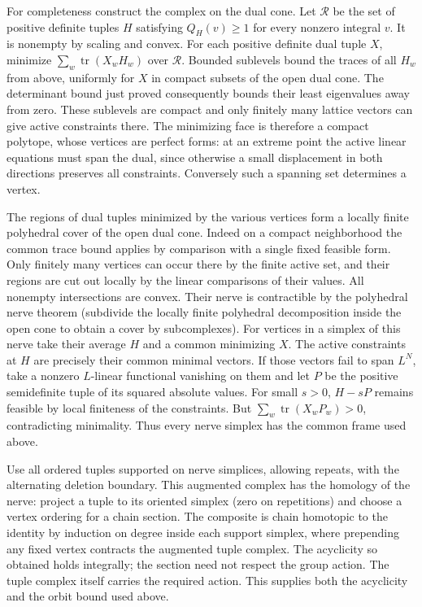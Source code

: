 \documentclass[11pt]{amsart}
\theoremstyle{definition}
\theoremstyle{remark}
\begin{document}
For completeness construct the complex on the dual cone. Let
$\mathcal R$ be the set of positive definite tuples $H$ satisfying
$Q_H(v)\ge1$ for every nonzero integral $v$. It is nonempty by scaling
and convex. For each positive definite dual tuple $X$, minimize
$\sum_w\operatorname{tr}(X_wH_w)$ over $\mathcal R$. Bounded
sublevels bound the traces of all $H_w$ from above, uniformly for
$X$ in compact subsets of the open dual cone. The determinant bound
just proved consequently bounds their least eigenvalues away from
zero. These sublevels are compact and only finitely many lattice
vectors can give active constraints there. The minimizing face is
therefore a compact polytope, whose vertices are perfect forms:
at an extreme point the active linear equations must span the dual,
since otherwise a small displacement in both directions preserves
all constraints. Conversely such a spanning set determines a vertex.

The regions of dual tuples minimized by the various vertices form a
locally finite polyhedral cover of the open dual cone. Indeed on a
compact neighborhood the common trace bound applies by comparison
with a single fixed feasible form. Only finitely many vertices can
occur there by the finite active set, and their regions are cut out
locally by the linear comparisons of their values. All nonempty
intersections are convex. Their nerve is contractible by the
polyhedral nerve theorem (subdivide the locally finite polyhedral
decomposition inside the open cone to obtain a cover by subcomplexes).
For vertices in a simplex of this nerve take their average $H$ and
a common minimizing $X$. The active constraints at $H$ are precisely
their common minimal vectors. If those vectors fail to span $L^N$,
take a nonzero $L$-linear functional vanishing on them and let $P$
be the positive semidefinite tuple of its squared absolute values.
For small $s>0$, $H-sP$ remains feasible by local finiteness of the
constraints. But $\sum_w\operatorname{tr}(X_wP_w)>0$, contradicting
minimality. Thus every nerve simplex has the common frame used above.

Use all ordered tuples supported on nerve simplices, allowing repeats,
with the alternating deletion boundary. This augmented complex has
the homology of the nerve: project a tuple to its oriented simplex
(zero on repetitions) and choose a vertex ordering for a chain section.
The composite is chain homotopic to the identity by induction on
degree inside each support simplex, where prepending any fixed
vertex contracts the augmented tuple complex. The acyclicity so
obtained holds integrally; the section need not respect the group
action. The tuple complex itself carries the required action. This
supplies both the acyclicity and the orbit bound used above.
\end{document}
